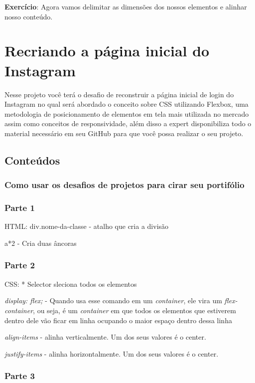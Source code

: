 \documentclass[12pt,a4paper]{article}
\begin{document}
	\textbf{Exercício}: Agora vamos delimitar as dimensões dos nossos elementos e alinhar nosso conteúdo.
	
	\section{Recriando a página inicial do Instagram}
	
	Nesse projeto você terá o desafio de reconstruir a página inicial de login do Instagram no qual será abordado o conceito sobre CSS utilizando Flexbox, uma metodologia de posicionamento de elementos em tela mais utilizada no mercado assim como conceitos de responsividade, além disso a expert disponibiliza todo o material necessário em seu GitHub para que você possa realizar o seu projeto.
	
	\subsection{Conteúdos}
	\subsubsection{Como usar os desafios de projetos para cirar seu portifólio}
	
	\subsubsection{Parte 1}
	
	HTML:
	div.nome-da-classe - atalho que cria a divisão
	
	a*2 - Cria duas âncoras
	
	\subsubsection{Parte 2}
	
	CSS: * Selector sleciona todos os elementos
	
	\textit{display: flex;} - Quando usa esse comando em um \textit{container}, ele vira um \textit{flex-container}, ou seja, é um \textit{container} em que todos os elementos que estiverem dentro dele vão ficar em linha ocupando o maior espaço dentro dessa linha
	
	\textit{align-items} - alinha verticalmente. Um dos seus valores é o center.
	
	\textit{justify-items} - alinha horizontalmente. Um dos seus valores é o center.
	
	\subsubsection{Parte 3}
	
\end{document}
